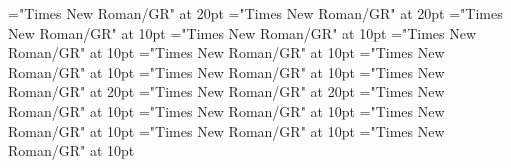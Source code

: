 \documentclass[a4paper]{article}
\begin{document}
\pagestyle{plain}
\sloppy
\setlength{\parfillskip}{0pt plus 1fil}
\font\pronunciationenUKpronunciationbefore="Times New Roman/GR" at 20pt
\font\pronunciationenUSpronunciationbefore="Times New Roman/GR" at 20pt
\font\sectionletterdictionary="Times New Roman/GR" at 10pt
\font\headsectionletterdictionary="Times New Roman/GR" at 10pt
\font\articledictionary="Times New Roman/GR" at 10pt
\font\headwordfirstoftypearticledictionary="Times New Roman/GR" at 10pt
\font\grammarrequiresfirstoftypearticledictionary="Times New Roman/GR" at 10pt
\font\relationsynonymfirstoftypearticledictionary="Times New Roman/GR" at 10pt
\font\pronunciationenUKarticledictionary="Times New Roman/GR" at 20pt
\font\pronunciationenUSarticledictionary="Times New Roman/GR" at 20pt
\font\grammarcategoryfirstoftypearticledictionary="Times New Roman/GR" at 10pt
\font{}="Times New Roman/GR" at 10pt
\font\notefirstoftypearticledictionary="Times New Roman/GR" at 10pt
\font\exampleusearticledictionary="Times New Roman/GR" at 10pt
\font\examplearticledictionary="Times New Roman/GR" at 10pt

\mbox{} 
\newpage 
\newpage 
\setcounter{page}{1} 
\pagestyle{fancy} 


\end{document}
